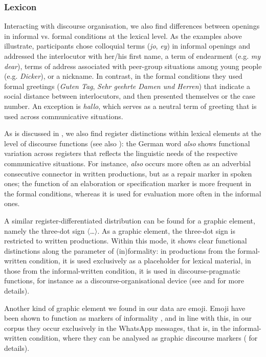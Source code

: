 \documentclass[output=paper,colorlinks,citecolor=brown]{langscibook}
\begin{document}
\subsubsection{Lexicon} \label{ch1:sec:3.1.3}
Interacting with discourse organisation, we also find differences between openings in informal vs. formal conditions at the lexical level. As the examples above illustrate, participants chose colloquial terms (\textit{jo}, \textit{ey}) in informal openings and addressed the interlocutor with her/his first name, a term of endearment (e.g. \textit{my dear}), terms of address associated with peer-group situations among young people (e.g. \textit{Dicker}), or a nickname. In contrast, in the formal conditions they used formal greetings (\textit{Guten Tag}, \textit{Sehr geehrte Damen und Herren}) that indicate a social distance between interlocutors, and then presented themselves or the case number. An exception is \textit{hallo}, which serves as a neutral term of greeting that is used across communicative situations.

As is discussed in , we also find register distinctions within lexical elements at the level of discourse functions (see also \cite{labrenz2023}): the German word \textit{also} shows functional variation across registers that reflects the linguistic needs of the respective communicative situations. For instance, \textit{also} occurs more often as an adverbial consecutive connector in written productions, but as a repair marker in spoken ones; the function of an elaboration or specification marker is more frequent in the formal conditions, whereas it is used for evaluation more often in the informal ones.

A similar register-differentiated distribution can be found for a graphic element, namely the three-dot sign 〈…〉. As a graphic element, the three-dot sign is restricted to written productions. Within this mode, it shows clear functional distinctions along the parameter of (in)formality: in productions from the formal\hyp written condition, it is used exclusively as a placeholder for lexical material, in those from the informal-written condition, it is used in discourse\hyp pragmatic functions, for instance as a discourse-organisational device (see  and \textcite{labrenzetal2022} for more details). 

Another kind of graphic element we found in our data are emoji. Emoji have been shown to function as markers of informality \parencite{siebenhaar2020}, and in line with this, in our corpus they occur exclusively in the WhatsApp messages, that is, in the informal-written condition, where they can be analysed as graphic discourse markers (\citealt{wieselabrenz2021} for details).
\end{document}
